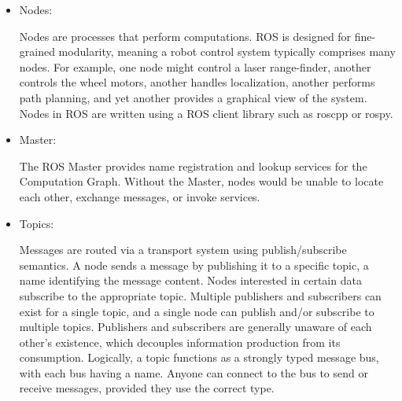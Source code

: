 \begin{itemize}
	\item Nodes:
	
	Nodes are processes that perform computations. ROS is designed for fine-grained modularity, meaning a robot control system typically comprises many nodes. For example, one node might control a laser range-finder, another controls the wheel motors, another handles localization, another performs path planning, and yet another provides a graphical view of the system. Nodes in ROS are written using a ROS client library such as roscpp or rospy.
	
	\item Master: 
	
	The ROS Master provides name registration and lookup services for the Computation Graph. Without the Master, nodes would be unable to locate each other, exchange messages, or invoke services.
	\item Topics:
	
	Messages are routed via a transport system using publish/subscribe semantics. A node sends a message by publishing it to a specific topic, a name identifying the message content. Nodes interested in certain data subscribe to the appropriate topic. Multiple publishers and subscribers can exist for a single topic, and a single node can publish and/or subscribe to multiple topics. Publishers and subscribers are generally unaware of each other's existence, which decouples information production from its consumption. Logically, a topic functions as a strongly typed message bus, with each bus having a name. Anyone can connect to the bus to send or receive messages, provided they use the correct type.
\end{itemize}









\newpage
